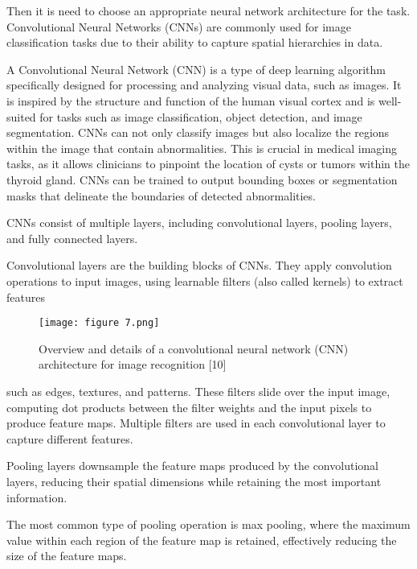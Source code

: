 \documentclass{article}
\begin{document}
\par Then it is need to choose an appropriate neural
network architecture for the task. Convolutional Neural
Networks (CNNs) are commonly used for image classification tasks due to their ability to capture spatial
hierarchies in data.

\par A Convolutional Neural Network (CNN) is a type
of deep learning algorithm specifically designed for
processing and analyzing visual data, such as images. It
is inspired by the structure and function of the human
visual cortex and is well-suited for tasks such as image
classification, object detection, and image segmentation.
CNNs can not only classify images but also localize
the regions within the image that contain abnormalities.
This is crucial in medical imaging tasks, as it allows
clinicians to pinpoint the location of cysts or tumors
within the thyroid gland. CNNs can be trained to output
bounding boxes or segmentation masks that delineate the
boundaries of detected abnormalities.

\par CNNs consist of multiple layers, including convolutional layers, pooling layers, and fully connected layers.

\par Convolutional layers are the building blocks of CNNs.
They apply convolution operations to input images, using
learnable filters (also called kernels) to extract features
\columnbreak

\begin{figure}[h]
    \centering
    \texttt{[image: figure 7.png]} %
    \caption{Overview and details of a convolutional neural network
(CNN) architecture for image recognition [10]}
\end{figure}


\noindent such as edges, textures, and patterns. These filters slide
over the input image, computing dot products between
the filter weights and the input pixels to produce feature
maps. Multiple filters are used in each convolutional layer
to capture different features.

\par Pooling layers downsample the feature maps produced
by the convolutional layers, reducing their spatial dimensions while retaining the most important information.

\par The most common type of pooling operation is max
pooling, where the maximum value within each region
of the feature map is retained, effectively reducing the
size of the feature maps.
\end{document}
